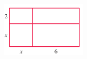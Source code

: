 \documentclass[letterpaper,fleqn]{article}
\begin{document}
\begin{enumerate}
 \includegraphics[scale=1]{Images/rectangulo01.png} 

 \end{enumerate}
\end{document}

